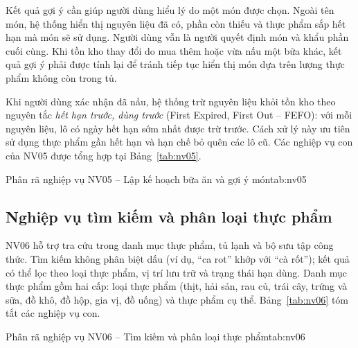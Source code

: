 Kết quả gợi ý cần giúp người dùng hiểu lý do một món được chọn. Ngoài tên món, hệ thống hiển thị nguyên liệu đã có, phần còn thiếu và thực phẩm sắp hết hạn mà món sẽ sử dụng. Người dùng vẫn là người quyết định món và khẩu phần cuối cùng. Khi tồn kho thay đổi do mua thêm hoặc vừa nấu một bữa khác, kết quả gợi ý phải được tính lại để tránh tiếp tục hiển thị món dựa trên lượng thực phẩm không còn trong tủ.

Khi người dùng xác nhận đã nấu, hệ thống trừ nguyên liệu khỏi tồn kho theo nguyên tắc \emph{hết hạn trước, dùng trước} (First Expired, First Out – FEFO): với mỗi nguyên liệu, lô có ngày hết hạn sớm nhất được trừ trước. Cách xử lý này ưu tiên sử dụng thực phẩm gần hết hạn và hạn chế bỏ quên các lô cũ. Các nghiệp vụ con của NV05 được tổng hợp tại Bảng~\ref{tab:nv05}.

\begin{nvtable}{Phân rã nghiệp vụ NV05 – Lập kế hoạch bữa ăn và gợi ý món}{tab:nv05}
\end{nvtable}

\subsection{Nghiệp vụ tìm kiếm và phân loại thực phẩm}\label{ssec:nv06}

NV06 hỗ trợ tra cứu trong danh mục thực phẩm, tủ lạnh và bộ sưu tập công thức. Tìm kiếm không phân biệt dấu (ví dụ, “ca rot” khớp với “cà rốt”); kết quả có thể lọc theo loại thực phẩm, vị trí lưu trữ và trạng thái hạn dùng. Danh mục thực phẩm gồm hai cấp: loại thực phẩm (thịt, hải sản, rau củ, trái cây, trứng và sữa, đồ khô, đồ hộp, gia vị, đồ uống) và thực phẩm cụ thể. Bảng~\ref{tab:nv06} tóm tắt các nghiệp vụ con.

\begin{nvtable}{Phân rã nghiệp vụ NV06 – Tìm kiếm và phân loại thực phẩm}{tab:nv06}
\end{nvtable}

